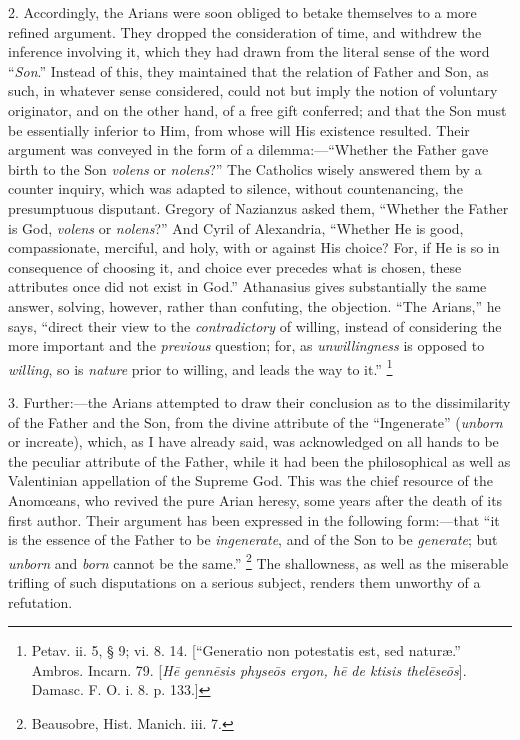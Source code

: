 2. Accordingly, the Arians were soon obliged to betake themselves
to a more refined argument. They dropped the consideration of time,
and withdrew the inference involving it, which they had drawn from the
literal sense of the word ``\emph{Son}.'' Instead of this,
they maintained that the relation of Father and Son, as such, in
whatever sense considered, could not but imply the notion of voluntary
originator, and on the other hand, of a free gift conferred; and that
the Son must be essentially inferior to Him, from whose will His
existence resulted. Their argument was conveyed in the form of a
dilemma:—``Whether the Father gave birth to the Son \emph{volens}
or \emph{nolens}?'' The Catholics wisely answered them by a
counter inquiry, which was adapted to silence, without countenancing,
the presumptuous disputant. Gregory of Nazianzus asked them,
``Whether the Father is God, \emph{volens} or \emph{nolens}?''
And Cyril of Alexandria, ``Whether He is good, compassionate,
merciful, and holy, with or against His choice? For, if He is so in
consequence of choosing it, and choice ever precedes what is chosen,
these attributes once did not exist in God.'' Athanasius gives
substantially the same answer, solving, however, rather than
confuting, the objection. ``The Arians,'' he says,
``direct their view to the \emph{contradictory} of willing,
instead of considering the more important and the \emph{previous}
question; for, as \emph{unwillingness} is opposed to \emph{willing},
so is \emph{nature} prior to willing, and leads the way to it.'' \footnote{Petav. ii. 5, § 9; vi. 8. 14. [``Generatio
non potestatis est, sed naturæ.'' Ambros. Incarn. 79. [\emph{H\={e}
genn\={e}sis physe\={o}s ergon, h\={e} de ktisis thel\={e}se\={o}s}].
Damasc. F. O. i. 8. p. 133.]}

3. Further:—the Arians attempted to draw their conclusion as to
the dissimilarity of the Father and the Son, from the divine attribute
of the ``Ingenerate'' (\emph{unborn} or increate), which, as I
have already said, was acknowledged on all hands to be the peculiar
attribute of the Father, while it had been the philosophical as
well as Valentinian appellation of the Supreme God. This was the chief
resource of the Anomœans, who revived the pure Arian heresy, some
years after the death of its first author. Their argument has been
expressed in the following form:—that ``it is the essence of the
Father to be \emph{ingenerate}, and of the Son to be \emph{generate};
but \emph{unborn} and \emph{born} cannot be the same.'' \footnote{Beausobre, Hist. Manich. iii. 7.} The shallowness, as well as the miserable trifling of such
disputations on a serious subject, renders them unworthy of a
refutation.

